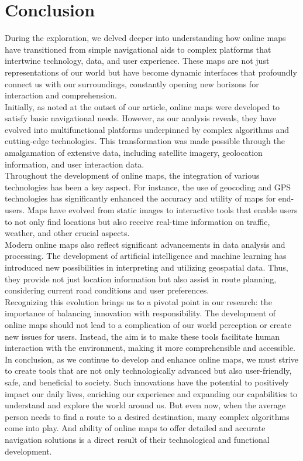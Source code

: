 \documentclass[10pt,oneside,english,a4paper]{article}
\begin{document}
\section{Conclusion} \label{conclusion}
During the exploration, we delved deeper into understanding how online maps have transitioned from simple navigational aids to complex platforms that intertwine technology, data, and user experience. These maps are not just representations of our world but have become dynamic interfaces that profoundly connect us with our surroundings, constantly opening new horizons for interaction and comprehension.
\\Initially, as noted at the outset of our article, online maps were developed to satisfy basic navigational needs. However, as our analysis reveals, they have evolved into multifunctional platforms underpinned by complex algorithms and cutting-edge technologies. This transformation was made possible through the amalgamation of extensive data, including satellite imagery, geolocation information, and user interaction data.
\\Throughout the development of online maps, the integration of various technologies has been a key aspect. For instance, the use of geocoding and GPS technologies has significantly enhanced the accuracy and utility of maps for end-users. Maps have evolved from static images to interactive tools that enable users to not only find locations but also receive real-time information on traffic, weather, and other crucial aspects.
\\Modern online maps also reflect significant advancements in data analysis and processing. The development of artificial intelligence and machine learning has introduced new possibilities in interpreting and utilizing geospatial data. Thus, they provide not just location information but also assist in route planning, considering current road conditions and user preferences.
\\Recognizing this evolution brings us to a pivotal point in our research: the importance of balancing innovation with responsibility. The development of online maps should not lead to a complication of our world perception or create new issues for users. Instead, the aim is to make these tools facilitate human interaction with the environment, making it more comprehensible and accessible.
\\In conclusion, as we continue to develop and enhance online maps, we must strive to create tools that are not only technologically advanced but also user-friendly, safe, and beneficial to society. Such innovations have the potential to positively impact our daily lives, enriching our experience and expanding our capabilities to understand and explore the world around us. But even now, when the average person needs to find a route to a desired destination, many complex algorithms come into play. And ability of online maps to offer detailed and accurate navigation solutions is a direct result of their technological and functional development.




\end{document}
